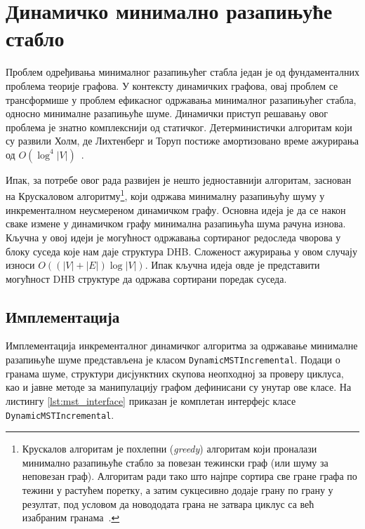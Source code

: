 \section{Динамичко минимално разапињуће стабло}

Проблем одређивања минималног разапињућег стабла један је од фундаменталних проблема теорије графова. У контексту динамичких графова, овај проблем се трансформише у проблем ефикасног одржавања минималног разапињућег стабла, односно минималне разапињуће шуме. Динамички приступ решавању овог проблема је знатно комплекснији од статичког. Детерминистички алгоритам који су развили Холм, де Лихтенберг и Торуп постиже амортизовано време ажурирања од $O(\log^4|V|)$~\cite{APPLICATIONS_OF_DYNAMIC_GRAPH}. 

Ипак, за потребе овог рада развијен је нешто једноставнији алгоритам, заснован на Крускаловом алгоритму\footnote{Крускалов алгоритам је похлепни (\textit{greedy}) алгоритам који проналази минимално разапињуће стабло за повезан тежински граф (или шуму за неповезан граф). Алгоритам ради тако што најпре сортира све гране графа по тежини у растућем поретку, а затим сукцесивно додаје грану по грану у резултат, под условом да новододата грана не затвара циклус са већ изабраним гранама~\cite{kruskalShortestSpanningSubtree1956}.}, који одржава минималну разапињућу шуму у инкременталном неусмереном динамичком графу. Основна идеја је да се након сваке измене у динамичком графу минимална разапињућа шума рачуна изнова. Кључна у овој идеји је могућност одржавања сортираног редоследа чворова у блоку суседа које нам даје структура DHB. Сложеност ажурирања у овом случају износи $O((|V|+|E|)\log|V|)$. Ипак кључна идеја овде је представити могућност DHB структуре да одржава сортирани поредак суседа.

\subsection{Имплементација}

Имплементација инкременталног динамичког алгоритма за одржавање минималне разапињуће шуме представљена је класом \texttt{DynamicMSTIncremental}. Подаци о гранама шуме, структури дисјунктних скупова неопходној за проверу циклуса, као и јавне методе за манипулацију графом дефинисани су унутар ове класе. На листингу \ref{lst:mst_interface} приказан је комплетан интерфејс класе \texttt{DynamicMSTIncremental}.

